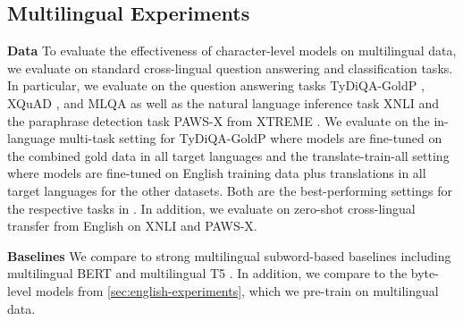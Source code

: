\documentclass{article} \usepackage{iclr2022_conference,times}
\begin{document}
\subsection{Multilingual Experiments} \label{sec:multilingual}



\noindent \textbf{Data}  To evaluate the effectiveness of character-level models on multilingual data, we evaluate on standard cross-lingual question answering and classification tasks. In particular, we evaluate on the question answering tasks TyDiQA-GoldP \citep{Clark2020tydiqa}, XQuAD \citep{Artetxe2020crosslingual}, and MLQA \citep{Lewis2020mlqa} as well as the natural language inference task XNLI \citep{Conneau2018xnli} and the paraphrase detection task PAWS-X \citep{Yang2019paws-x} from XTREME \citep{Hu2020xtreme}. We evaluate on the in-language multi-task setting for TyDiQA-GoldP \citep{Clark2020tydiqa} where models are fine-tuned on the combined gold data in all target languages and the translate-train-all setting where models are fine-tuned on English training data plus translations in all target languages for the other datasets. Both are the best-performing settings for the respective tasks in \citep{Hu2020xtreme}. In addition, we evaluate on zero-shot cross-lingual transfer from English on XNLI and PAWS-X.

\noindent \textbf{Baselines}  We compare to strong multilingual subword-based baselines including multilingual BERT \citep{Devlin2019bert} and multilingual T5 \citep{xue2020mt5}. In addition, we compare to the byte-level models from \textsection \ref{sec:english-experiments}, which we pre-train on multilingual data.
\end{document}
